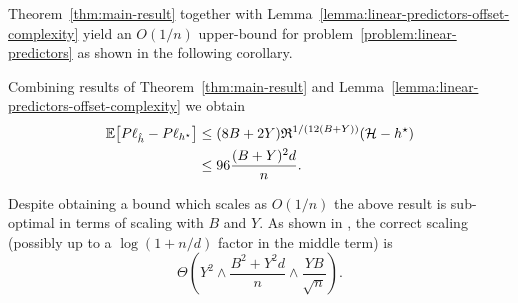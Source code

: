 \documentclass[main.tex]{subfiles}
\begin{document}
Theorem~\ref{thm:main-result} together with
Lemma~\ref{lemma:linear-predictors-offset-complexity}
yield an $O(1/n)$ upper-bound for problem~\ref{problem:linear-predictors}
as shown in the following corollary.
\begin{corollary}
  \label{corollary:linear-predictors-fast-rates}
  Combining results of Theorem~\ref{thm:main-result} and
  Lemma~\ref{lemma:linear-predictors-offset-complexity} we obtain
  \begin{align*}
    \mathbb{E}\!\left[{P\ell_{\hat{h}} - P\ell_{h^{\star}}}\right]
    &\leq
    (8B + 2Y) \mathfrak{R}^{1/(12(B+Y))}(\mathcal{H} - h^{\star}) \\
    &\leq
    96\frac{(B+Y)^{2}d}{n}.
  \end{align*}
\end{corollary}

\begin{remark}
  Despite obtaining a bound which scales as $O(1/n)$ the above result
  is sub-optimal in terms of scaling with $B$ and $Y$.
  As shown in \citet{shamir2015sample}, the correct scaling (possibly up to
  a $\log(1 + n/d)$ factor in the middle term) is
  $$\Theta\left(Y^{2} \wedge \frac{B^{2} + Y^{2}d}{n} \wedge
    \frac{YB}{\sqrt{n}}\right).
  $$
\end{remark}
\end{document}
